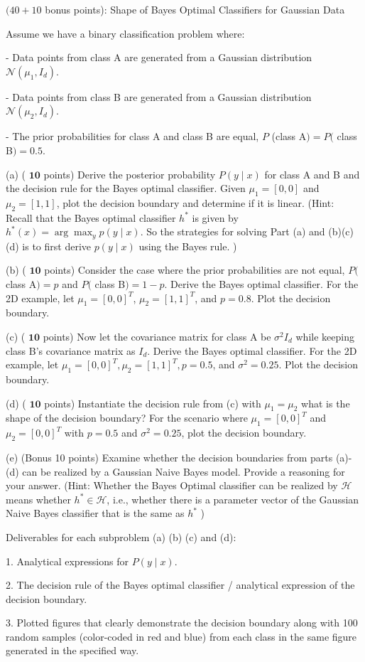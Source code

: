\documentclass[en,hazy,blue,12pt,normal]{elegantnote}
\begin{document}
\begin{homework}
    $(40+10$ bonus points): Shape of Bayes Optimal Classifiers for Gaussian Data

Assume we have a binary classification problem where:

- Data points from class A are generated from a Gaussian distribution $\mathcal{N}\left(\mu_1, I_d\right)$.

- Data points from class B are generated from a Gaussian distribution $\mathcal{N}\left(\mu_2, I_d\right)$.

- The prior probabilities for class A and class B are equal, $P$ (class A$)=P($ class B$)=0.5$.

(a) ( $\mathbf{1 0}$ points) Derive the posterior probability $P(y \mid x)$ for class A and B and the decision rule for the Bayes optimal classifier. Given $\mu_1=[0,0]$ and $\mu_2=[1,1]$, plot the decision boundary and determine if it is linear.
(Hint: Recall that the Bayes optimal classifier $h^*$ is given by $h^*(x)=\arg \max _y p(y \mid x)$. So the strategies for solving Part (a) and (b)(c)(d) is to first derive $p(y \mid x)$ using the Bayes rule. )

(b) ( $\mathbf{1 0}$ points) Consider the case where the prior probabilities are not equal, $P($ class A$)=p$ and $P($ class B$)=1-p$. Derive the Bayes optimal classifier. For the 2D example, let $\mu_1=[0,0]^T$, $\mu_2=[1,1]^T$, and $p=0.8$. Plot the decision boundary.

(c) ( $\mathbf{1 0}$ points) Now let the covariance matrix for class A be $\sigma^2 I_d$ while keeping class B's covariance matrix as $I_d$. Derive the Bayes optimal classifier. For the 2D example, let $\mu_1= [0,0]^T, \mu_2=[1,1]^T, p=0.5$, and $\sigma^2=0.25$. Plot the decision boundary.

(d) ( $\mathbf{1 0}$ points) Instantiate the decision rule from (c) with $\mu_1=\mu_2$ what is the shape of the decision boundary? For the scenario where $\mu_1=[0,0]^T$ and $\mu_2=[0,0]^T$ with $p=0.5$ and $\sigma^2=0.25$, plot the decision boundary.

(e) (Bonus 10 points) Examine whether the decision boundaries from parts (a)-(d) can be realized by a Gaussian Naive Bayes model. Provide a reasoning for your answer. (Hint: Whether the Bayes Optimal classifier can be realized by $\mathcal{H}$ means whether $h^* \in \mathcal{H}$, i.e., whether there is a parameter vector of the Gaussian Naive Bayes classifier that is the same as $h^*$ )

Deliverables for each subproblem (a) (b) (c) and (d):

1. Analytical expressions for $P(y \mid x)$.

2. The decision rule of the Bayes optimal classifier / analytical expression of the decision boundary.

3. Plotted figures that clearly demonstrate the decision boundary along with 100 random samples (color-coded in red and blue) from each class in the same figure generated in the specified way.

\end{homework}
\end{document}

